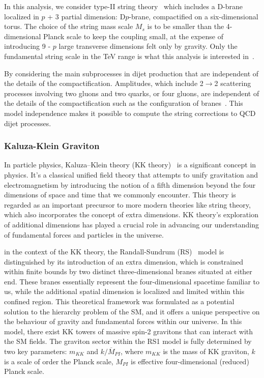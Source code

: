 \documentclass[UTF8,12pt]{ctexart}
\numberwithin{equation}{section}
\def\to{\rightarrow}
\begin{document}
In this analysis, we consider type-II string theory~\cite{StringBook} which includes a D-brane localized in $p$ + 3 partial dimension: D$p$-brane, compactified on a six-dimensional torus. The choice of the string mass scale $M_s$ is to be smaller than the 4-dimensional Planck scale to keep the coupling small, at the expense of introducing 9 - $p$ large transverse dimensions felt only by gravity. Only the fundamental string scale in the TeV range is what this analysis is interested in~\cite{Cullen:2000ef}.


By considering the main subprocesses in dijet production that are independent of the details of the compactification. Amplitudes, which include 2$\to$2 scattering processes involving two gluons and two quarks, or four gluons,  are independent of the details of the compactification such as the configuration of branes~\cite{Lust:2008qc}. This model independence makes it possible to compute the string corrections to QCD dijet processes.

\subsubsection{Kaluza-Klein Graviton}
In particle physics, Kaluza–Klein theory (KK theory)~\cite{Klein:1926tv} is a significant concept in physics. It's a classical unified field theory that attempts to unify gravitation and electromagnetism by introducing the notion of a fifth dimension beyond the four dimensions of space and time that we commonly encounter. This theory is regarded as an important precursor to more modern theories like string theory, which also incorporates the concept of extra dimensions. KK theory's exploration of additional dimensions has played a crucial role in advancing our understanding of fundamental forces and particles in the universe.

in the context of the KK theory, the Randall-Sundrum (RS)~\cite{Randall:1999ee} model is distinguished by its introduction of an extra dimension, which is constrained within finite bounds by two distinct three-dimensional branes situated at either end. These branes essentially represent the four-dimensional spacetime familiar to us, while the additional spatial dimension is localized and limited within this confined region. This theoretical framework was formulated as a potential solution to the hierarchy problem of the SM, and it offers a unique perspective on the behaviour of gravity and fundamental forces within our universe.  In this model, there exist KK towers of massive spin-2 gravitons that can interact with the SM fields. The graviton sector within the RS1 model is fully determined by two key parameters: $m_{KK}$ and $k/\overline{M}_{PI}$, where $m_{KK}$ is the mass of KK graviton, $k$ is a scale of order the Planck scale, ${M}_{PI}$ is effective four-dimensional (reduced) Planck scale.
\end{document}
